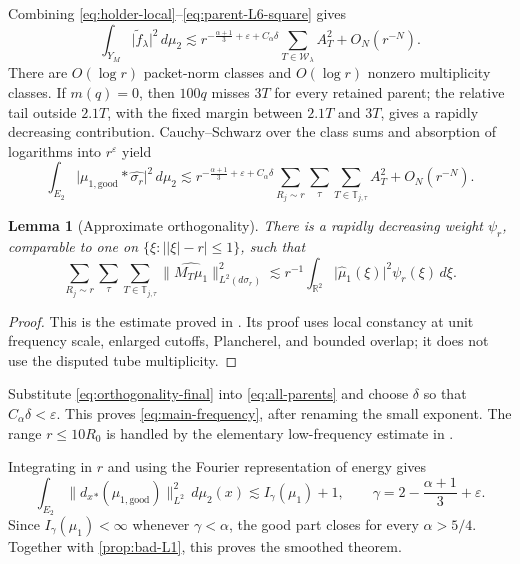 \documentclass[11pt,letterpaper]{amsart}
\newtheorem{lemma}[lemma]{Lemma}
\newcommand{\R}{\mathbb{R}}
\newcommand{\wh}{\widehat}
\newcommand{\eps}{\varepsilon}
\newcommand{\cW}{\mathcal{W}}
\newcommand{\abs}[1]{\lvert#1\rvert}
\newcommand{\norm}[1]{\lVert#1\rVert}
\begin{document}
Combining \eqref{eq:holder-local}--\eqref{eq:parent-L6-square} gives
\begin{equation}\label{eq:class-estimate}
 \int_{Y_M}\abs{\widetilde f_\lambda}^2\,d\mu_2
 \lesssim
 r^{-\frac{\alpha+1}{3}+\eps+C_\alpha\delta}
 \sum_{T\in\cW_\lambda}A_T^2
 +O_N(r^{-N}).
\end{equation}
There are \(O(\log r)\) packet-norm classes and \(O(\log r)\) nonzero
multiplicity classes.  If \(m(q)=0\), then \(100q\) misses \(3T\) for every
retained parent; the relative tail outside \(2.1T\), with the fixed margin
between \(2.1T\) and \(3T\), gives a rapidly decreasing contribution.
Cauchy--Schwarz over the class sums and absorption of logarithms into
\(r^\eps\) yield
\begin{equation}\label{eq:all-parents}
 \int_{E_2}\abs{\mu_{1,\mathrm{good}}*\wh{\sigma_r}}^2\,d\mu_2
 \lesssim
 r^{-\frac{\alpha+1}{3}+\eps+C_\alpha\delta}
 \sum_{R_j\sim r}\sum_\tau\sum_{T\in\mathbb T_{j,\tau}}A_T^2
 +O_N(r^{-N}).
\end{equation}

\begin{lemma}[Approximate orthogonality]
\label{lem:orthogonality}
There is a rapidly decreasing weight \(\psi_r\), comparable to one on
\(\{\xi:\abs{\abs{\xi}-r}\le1\}\), such that
\begin{equation}\label{eq:orthogonality-final}
 \sum_{R_j\sim r}\sum_\tau\sum_{T\in\mathbb T_{j,\tau}}
 \norm{\wh{M_T\mu_1}}_{L^2(d\sigma_r)}^2
 \lesssim r^{-1}
 \int_{\R^2}\abs{\wh\mu_1(\xi)}^2\psi_r(\xi)\,d\xi.
\end{equation}
\end{lemma}

\begin{proof}
This is the estimate proved in \cite[(5.3), pp.~35--37]{GIOW}.  Its proof
uses local constancy at unit frequency scale, enlarged cutoffs, Plancherel,
and bounded overlap; it does not use the disputed tube multiplicity.
\end{proof}

Substitute \eqref{eq:orthogonality-final} into
\eqref{eq:all-parents} and choose \(\delta\) so that
\(C_\alpha\delta<\eps\).  This proves \eqref{eq:main-frequency}, after
renaming the small exponent.  The range \(r\le10R_0\) is handled by the
elementary low-frequency estimate in \cite[Section~5]{GIOW}.

Integrating in \(r\) and using the Fourier representation of energy gives
\[
 \int_{E_2}\norm{d_x{}_*(\mu_{1,\mathrm{good}})}_{L^2}^2\,d\mu_2(x)
 \lesssim I_\gamma(\mu_1)+1,
 \qquad
 \gamma=2-\frac{\alpha+1}{3}+\eps.
\]
Since \(I_\gamma(\mu_1)<\infty\) whenever \(\gamma<\alpha\), the good part
closes for every \(\alpha>5/4\).  Together with
\cref{prop:bad-L1}, this proves the smoothed theorem.
\end{document}
